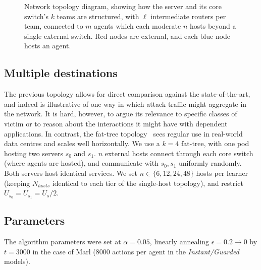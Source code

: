 \begin{figure}
	\centering
	\resizebox{0.9\linewidth}{!}{}
	\caption[Tree-structured network topology diagram for evaluating a single-destination network.]{
		Network topology diagram, showing how the server and its core switch's $k$ teams are structured, with $\ell$ intermediate routers per team, connected to $m$ agents which each moderate $n$ hosts beyond a single external switch.
		Red nodes are external, and each blue node hosts an agent.
		\label{fig:marl-topol}
	}
\end{figure}

\subsection{Multiple destinations}
The previous topology allows for direct comparison against the state-of-the-art, and indeed is illustrative of one way in which attack traffic might aggregate in the network.
It is hard, however, to argue its relevance to specific classes of victim or to reason about the interactions it might have with dependent applications.
In contrast, the fat-tree topology~\parencite{DBLP:conf/sigcomm/Al-FaresLV08} sees regular use in real-world data centres and scales well horizontally.
We use a $k=4$ fat-tree, with one pod hosting two servers $s_0$ and $s_1$.
$n$ external hosts connect through each core switch (where agents are hosted), and communicate with $s_0, s_1$ uniformly randomly.
Both servers host identical services.
We set $n \in \{6, 12, 24, 48\}$ hosts per learner (keeping $N_{\mathit{hosts}}$ identical to each tier of the single-host topology), and restrict $U_{s_0} = U_{s_1} = U_s / 2$.

\subsection{Parameters}
The algorithm parameters were set at $\alpha=0.05$, linearly annealing $\epsilon=0.2 \rightarrow 0$ by $t=3000$ in the case of Marl (\num{8000} actions per agent in the \emph{Instant/Guarded} models).

